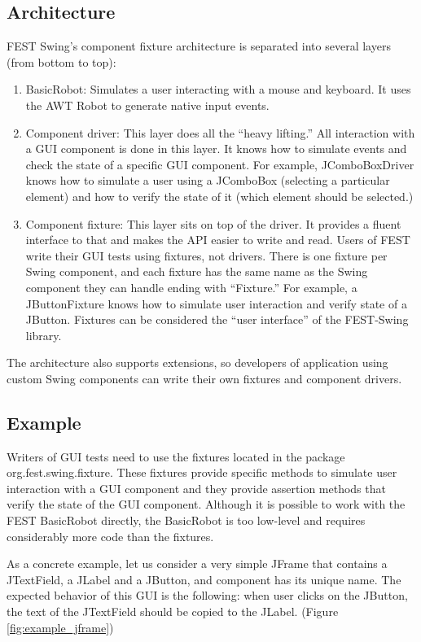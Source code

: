 \subsection{Architecture}

FEST Swing's component fixture architecture is separated into several layers (from bottom to top):
\begin{enumerate}
\item BasicRobot: Simulates a user interacting with a mouse and keyboard. It uses the AWT Robot to generate native input events.
\item Component driver: This layer does all the ``heavy lifting.'' All interaction with a GUI component is done in this layer. It knows how to simulate events and check the state of a specific GUI component. For example, JComboBoxDriver knows how to simulate a user using a JComboBox (selecting a particular element) and how to verify the state of it (which element should be selected.)
\item Component fixture: This layer sits on top of the driver. It provides a fluent interface to that and makes the API easier to write and read. Users of FEST write their GUI tests using fixtures, not drivers. There is one fixture per Swing component, and each fixture has the same name as the Swing component they can handle ending with ``Fixture.'' For example, a JButtonFixture knows how to simulate user interaction and verify state of a JButton. Fixtures can be considered the ``user interface'' of the FEST-Swing library.
\end{enumerate}

The architecture also supports extensions, so developers of application using custom Swing components can write their own fixtures and component drivers.

\subsection{Example}

Writers of GUI tests need to use the fixtures located in the package org.fest.swing.fixture. These fixtures provide specific methods to simulate user interaction with a GUI component and they provide assertion methods that verify the state of the GUI component. Although it is possible to work with the FEST BasicRobot directly, the BasicRobot is too low-level and requires considerably more code than the fixtures.

As a concrete example, let us consider a very simple JFrame that contains a JTextField, a JLabel and a JButton, and component has its unique name. The expected behavior of this GUI is the following: when user clicks on the JButton, the text of the JTextField should be copied to the JLabel. (Figure \ref{fig:example_jframe}) 

